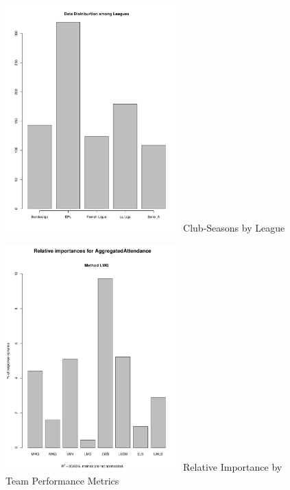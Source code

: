 \documentclass[inte,blindrev]{informs3}
\begin{document}
\begin{figure}
\FIGURE
{\includegraphics[height = 0.5\textheight, width = 0.6\textwidth]{Figure4}}
{Club-Seasons by League\label{Fig4}}
{}
\end{figure}

\begin{figure}
\FIGURE
{\includegraphics[height = 0.5\textheight, width = 0.6\textwidth]{Figure5}}
{Relative Importance by Team Performance Metrics\label{Rel}}
{}
\end{figure}
\end{document}
